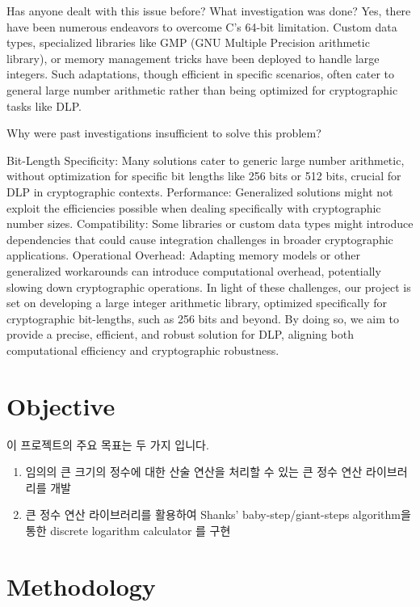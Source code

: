 \documentclass[12pt,a4paper]{article}
\begin{document}
	Has anyone dealt with this issue before? What investigation was done?
	Yes, there have been numerous endeavors to overcome C's 64-bit limitation. Custom data types, specialized libraries like GMP (GNU Multiple Precision arithmetic library), or memory management tricks have been deployed to handle large integers. Such adaptations, though efficient in specific scenarios, often cater to general large number arithmetic rather than being optimized for cryptographic tasks like DLP.
	
	Why were past investigations insufficient to solve this problem?
	
	Bit-Length Specificity: Many solutions cater to generic large number arithmetic, without optimization for specific bit lengths like 256 bits or 512 bits, crucial for DLP in cryptographic contexts.
	Performance: Generalized solutions might not exploit the efficiencies possible when dealing specifically with cryptographic number sizes.
	Compatibility: Some libraries or custom data types might introduce dependencies that could cause integration challenges in broader cryptographic applications.
	Operational Overhead: Adapting memory models or other generalized workarounds can introduce computational overhead, potentially slowing down cryptographic operations.
	In light of these challenges, our project is set on developing a large integer arithmetic library, optimized specifically for cryptographic bit-lengths, such as 256 bits and beyond. By doing so, we aim to provide a precise, efficient, and robust solution for DLP, aligning both computational efficiency and cryptographic robustness.
	
	\newpage
	\section{Objective}
	이 프로젝트의 주요 목표는 두 가지 입니다.
	
	\begin{enumerate}
		\item 임의의 큰 크기의 정수에 대한 산술 연산을 처리할 수 있는 큰 정수 연산 라이브러리를 개발
		\item 큰 정수 연산 라이브러리를 활용하여 Shanks' baby-step/giant-steps algorithm을 통한 discrete logarithm calculator 를 구현
	\end{enumerate}
	
	\section{Methodology}
	
\end{document}

